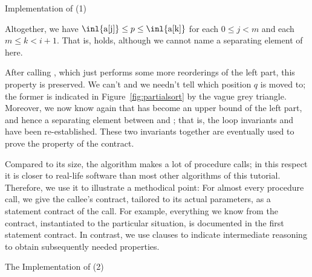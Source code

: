 \begin{listing}[t]
\begin{minipage}{\textwidth}

\end{minipage}
\caption{Implementation of \partialsort (1)}
\end{listing}



\FloatBarrier

Altogether, we have  $\mbox{\inl{a[j]}} \leq p \leq \mbox{\inl{a[k]}}$
for each $0 \leq j < m$ and each $m \leq k < i+1$.
%
That is,  holds, although we cannot name a
separating element of  here.


After calling \pushheap, which just performs some more 
reorderings of the left part, this property is preserved. 
We can't and we needn't tell which position $q$ is moved to;
the former is indicated in Figure~\ref{fig:partialsort}
by the vague grey triangle.
%
Moreover, we now know again that  has become an upper bound
of the left part,
and hence a separating element between
 and ;
that is, the loop invariants  and  have been
re-established.
%
These two invariants together are eventually used to prove
the property  of the contract.

Compared to its size, the algorithm makes a
lot of procedure calls; in this respect it is closer to real-life
software than most other algorithms of this tutorial.
%
Therefore, we use it to illustrate a methodical point:
%
For almost every procedure call, we give the callee's contract,
tailored to its actual parameters, as a statement contract of the call.
%
For example, everything we know from the \popheap contract,
instantiated to the particular situation, is documented in the
first statement contract.
%
In contrast, we use  clauses to indicate intermediate
reasoning to obtain subsequently needed properties.

\begin{listing}[t]
\begin{minipage}{\textwidth}

\end{minipage}
\caption{The Implementation of
\partialsort (2)}
\end{listing}

